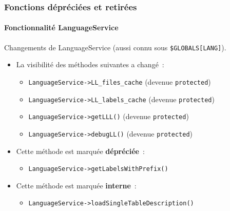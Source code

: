 
\begin{frame}[fragile]
	\frametitle{Fonctions dépréciées et retirées}
	\framesubtitle{Fonctionnalité LanguageService}

	Changements de LanguageService (aussi connu sous \texttt{\$GLOBALS[LANG]}).
	\vspace{0.4cm}
	\begin{itemize}
		\item La visibilité des méthodes suivantes a changé~:
			\begin{itemize}\smaller
				\item \texttt{LanguageService->LL\_files\_cache} (devenue \texttt{protected})
				\item \texttt{LanguageService->LL\_labels\_cache} (devenue \texttt{protected})
				\item \texttt{LanguageService->getLLL()} (devenue \texttt{protected})
				\item \texttt{LanguageService->debugLL()} (devenue \texttt{protected})
			\end{itemize}\normalsize
			\vspace{0.2cm}

		\item Cette méthode est marquée \textbf{dépréciée}~:
			\begin{itemize}\smaller
				\item \texttt{LanguageService->getLabelsWithPrefix()}
			\end{itemize}\normalsize
			\vspace{0.2cm}

		\item Cette méthode est marquée \textbf{interne}~:
			\begin{itemize}\smaller
				\item \texttt{LanguageService->loadSingleTableDescription()}
			\end{itemize}\normalsize
			\vspace{0.2cm}

	\end{itemize}

\end{frame}


